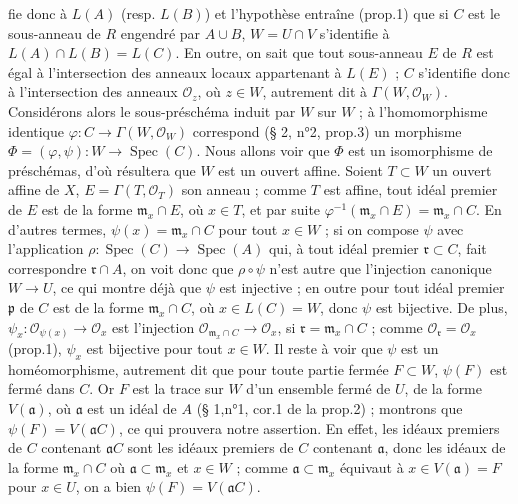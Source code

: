 fie donc à $L(A)$ (resp. $L(B)$) et l'hypothèse entraîne (prop.1) que si $C$ est le sous-anneau de $R$ engendré par $A \cup B$, $W=U \cap V$ s'identifie à $L(A) \cap L(B) = L(C)$. En outre, on sait que tout sous-anneau $E$ de $R$ est égal à l'intersection des anneaux locaux appartenant à $L(E)$ ; $C$ s'identifie donc à l'intersection des anneaux $\mathcal{O}_z$, où $z \in W$, autrement dit à $\Gamma(W, \mathcal{O}_W)$. Considérons alors le sous-préschéma induit par $W$ sur $W$ ; à l'homomorphisme identique $\varphi: C \to \Gamma(W, \mathcal{O}_W)$ correspond (§ 2, n°2, prop.3) un morphisme $\Phi = (\varphi, \psi): W \to \operatorname{Spec}(C)$. Nous allons voir que $\Phi$ est un isomorphisme de préschémas, d'où résultera que $W$ est un ouvert affine. Soient $T \subset W$ un ouvert affine de $X$, $E = \Gamma(T, \mathcal{O}_T)$ son anneau ; comme $T$ est affine, tout idéal premier de $E$ est de la forme $\mathfrak{m}_x \cap E$, où $x \in T$, et par suite $\varphi^{-1}(\mathfrak{m}_x \cap E) = \mathfrak{m}_x \cap C$. En d'autres termes, $\psi(x) = \mathfrak{m}_x \cap C$ pour tout $x \in W$ ; si on compose $\psi$ avec l'application $\rho: \operatorname{Spec}(C) \to \operatorname{Spec}(A)$ qui, à tout idéal premier $\mathfrak{r} \subset C$, fait correspondre $\mathfrak{r} \cap A$, on voit donc que $\rho \circ \psi$ n'est autre que l'injection canonique $W \to U$, ce qui montre déjà que $\psi$ est injective ; en outre pour tout idéal premier $\mathfrak{p}$ de $C$ est de la forme $\mathfrak{m}_x \cap C$, où $x \in L(C)=W$, donc $\psi$ est bijective. De plus, $\psi_x: \mathcal{O}_{\psi(x)} \to \mathcal{O}_x$ est l'injection $\mathcal{O}_{\mathfrak{m}_x \cap C} \to \mathcal{O}_x$, si $\mathfrak{r} = \mathfrak{m}_x \cap C$ ; comme $\mathcal{O}_{\mathfrak{r}} = \mathcal{O}_x$ (prop.1), $\psi_x$ est bijective pour tout $x \in W$. Il reste à voir que $\psi$ est un homéomorphisme, autrement dit que pour toute partie fermée $F \subset W$, $\psi(F)$ est fermé dans $C$. Or $F$ est la trace sur $W$ d'un ensemble fermé de $U$, de la forme $V(\mathfrak{a})$, où $\mathfrak{a}$ est un idéal de $A$ (§ 1,n°1, cor.1 de la prop.2) ; montrons que $\psi(F) = V(\mathfrak{a} C)$, ce qui prouvera notre assertion. En effet, les idéaux premiers de $C$ contenant $\mathfrak{a} C$ sont les idéaux premiers de $C$ contenant $\mathfrak{a}$, donc les idéaux de la forme $\mathfrak{m}_x \cap C$ où $\mathfrak{a} \subset \mathfrak{m}_x$ et $x \in W$ ; comme $\mathfrak{a} \subset \mathfrak{m}_x$ équivaut à $x \in V(\mathfrak{a}) = F$ pour $x \in U$, on a bien $\psi(F) = V(\mathfrak{a} C)$.

